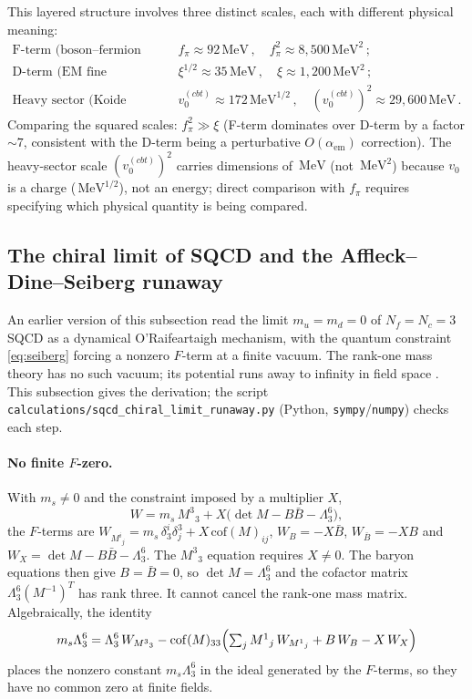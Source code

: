 \documentclass[12pt,a4paper]{article}
\newcommand{\MeV}{\,\text{MeV}}
\begin{document}
This layered structure involves three distinct scales, each with 
different physical meaning:
\begin{align}
\text{F-term (boson--fermion splitting):} &\quad 
f_\pi \approx 92\MeV\,, \quad f_\pi^2 \approx 8{,}500\MeV^2\,; \\
\text{D-term (EM fine structure):} &\quad 
\xi^{1/2} \approx 35\MeV\,, \quad \xi \approx 1{,}200\MeV^2\,; \\
\text{Heavy sector (Koide scale):} &\quad 
v_0^{(cbt)} \approx 172\MeV^{1/2}\,, \quad (v_0^{(cbt)})^2 \approx 29{,}600\MeV\,.
\end{align}
Comparing the squared scales: $f_\pi^2 \gg \xi$ (F-term dominates 
over D-term by a factor $\sim 7$, consistent with the D-term being 
a perturbative $O(\alpha_{\text{em}})$ correction). The heavy-sector 
scale $(v_0^{(cbt)})^2$ carries dimensions of $\MeV$ (not $\MeV^2$) 
because $v_0$ is a charge ($\MeV^{1/2}$), not an energy; direct 
comparison with $f_\pi$ requires specifying which physical quantity 
is being compared.

\subsection{The chiral limit of SQCD and the Affleck--Dine--Seiberg runaway}
\label{subsec:sqcd_runaway}

An earlier version of this subsection read the limit $m_u = m_d = 0$
of $N_f = N_c = 3$ SQCD as a dynamical O'Raifeartaigh mechanism, with
the quantum constraint \eqref{eq:seiberg} forcing a nonzero $F$-term
at a finite vacuum. The rank-one mass theory has no such vacuum; its
potential runs away to infinity in field space
\cite{ADS1984,IntriligatorSeiberg1995}. This subsection gives the
derivation; the script \texttt{calculations/sqcd\_chiral\_limit\_runaway.py}
(Python, \texttt{sympy}/\texttt{numpy}) checks each step.

\paragraph{No finite $F$-zero.}
With $m_s \neq 0$ and the constraint imposed by a multiplier $X$,
\begin{equation}
\label{eq:rank1W}
W = m_s\,M^3{}_3 + X\bigl(\det M - B\bar B - \Lambda_3^6\bigr),
\end{equation}
the $F$-terms are $W_{M^i{}_j} = m_s\,\delta^i_3\delta^3_j
+ X\,\mathrm{cof}(M)_{ij}$, $W_B = -X\bar B$, $W_{\bar B} = -XB$ and
$W_X = \det M - B\bar B - \Lambda_3^6$. The $M^3{}_3$ equation requires
$X \neq 0$. The baryon equations then give $B = \bar B = 0$, so
$\det M = \Lambda_3^6$ and the cofactor matrix
$\Lambda_3^6 (M^{-1})^{T}$ has rank three. It cannot cancel the rank-one
mass matrix. Algebraically, the identity
\begin{equation*}
m_s\Lambda_3^6 = \Lambda_3^6\,W_{M^3{}_3}
 - \mathrm{cof}(M)_{33}\Bigl(\textstyle\sum_j M^1{}_j\,W_{M^1{}_j}
 + B\,W_B - X\,W_X\Bigr)
\end{equation*}
places the nonzero constant $m_s\Lambda_3^6$ in the ideal generated by
the $F$-terms, so they have no common zero at finite fields.
\end{document}
